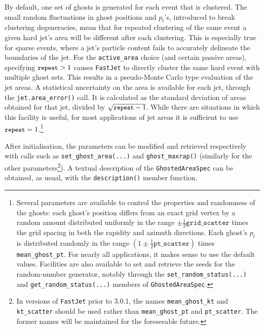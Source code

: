 \documentclass[12pt,a4]{article}
\newcommand{\fastjet}{\texttt{FastJet}\xspace}
\newcommand{\ttt}[1]{{\small\texttt{#1}}}
\begin{document}
By default, one set of ghosts is generated for each event that is
clustered.
%
The small random fluctuations in ghost positions and $p_t$'s,
introduced to break clustering degeneracies, mean that for repeated
clustering of the same event a given hard jet's area will be different
after each clustering.
%
This is especially true for sparse events, where a jet's particle
content fails to accurately delineate the boundaries of the jet.
%
For the \texttt{active\_area} choice (and certain passive areas),
specifying $\ttt{repeat} > 1$ causes \fastjet to directly cluster the
same hard event with multiple ghost sets.
%
This results in a pseudo-Monte Carlo type evaluation of the jet areas.
%
A statistical uncertainty on the area is available for each jet,
through the \ttt{jet.area\_error()} call.
%
It is calculated as the standard deviation of areas obtained for that
jet, divided by $\sqrt{\ttt{repeat}-1}$.
%
While there are situations in which this facility is useful, for most
applications of jet areas it is sufficient to use
$\ttt{repeat}=1$.\footnote{%
  Several parameters are available to control the properties and
  randomness of the ghosts: each ghost's position differs from an
  exact grid vertex by a random amount distributed uniformly in the
  range $\pm \frac12 \texttt{grid\_scatter}$ times the grid spacing in
  both the rapidity and azimuth directions.
  Each ghost's $p_t$ is distributed randomly in the range $(1 \pm \frac12
  \texttt{pt\_scatter})$ times \texttt{mean\_ghost\_pt}.
  For nearly all applications, it makes sense to use the default
  values.
  Facilities are also available to set and retrieve the seeds for the
  random-number generator, notably through the
  \texttt{set\_random\_status(...)} and
  \texttt{get\_random\_status(...)} members of
  \texttt{GhostedAreaSpec}.  }



After initialisation, the parameters can be modified and retrieved
respectively with calls such as \ttt{set\_ghost\_area(...)} and
\ttt{ghost\_maxrap()} (similarly for the other
parameters\footnote{In versions of \fastjet prior to 3.0.1, the names
  \texttt{mean\_ghost\_kt} and \texttt{kt\_scatter} should be used
  rather than \texttt{mean\_ghost\_pt} and \texttt{pt\_scatter}. The
  former names will be maintained for the foreseeable future.}).
%
A textual description of the \ttt{GhostedAreaSpec} can be obtained, as
usual, with the \ttt{description()} member function.

\end{document}
